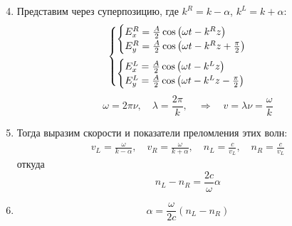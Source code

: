 \documentclass[10pt,pdf,hyperref={unicode}, dvipsnames]{beamer}
\begin{document}
\begin{frame}
	\begin{enumerate} 
		\setcounter{enumi}{3}
		\item
		      Представим через суперпозицию, где $k^R=k-\alpha$, $k^L=k+\alpha$:
		      \begin{gather*}
			      \begin{cases}
				      \begin{cases} 
					      E_x^R = \frac{A}{2}
					      \cos\left(
					      \omega t - k^Rz
					      \right)
					      \\
					      E_y^R = \frac{A}{2}
					      \cos\left(
					      \omega t - k^Rz +\frac{\pi}{2}
					      \right)
				      \end{cases}\vspace{0.5em} \\
				      \begin{cases} 
					      E_x^L = \frac{A}{2}
					      \cos\left(
					      \omega t - k^Lz
					      \right)
					      \\
					      E_y^L = \frac{A}{2}
					      \cos\left(
					      \omega t - k^Lz -\frac{\pi}{2}
					      \right)
				      \end{cases}
			      \end{cases}
		      \end{gather*}
		      \begin{equation*}
			      \omega=2\pi\nu,\quad
			      \lambda=\frac{2\pi}{k},\quad\Rightarrow\quad
			      v=\lambda\nu=\frac{\omega}{k}
		      \end{equation*}
		\item
		      Тогда выразим скорости и показатели преломления этих волн:
		      \begin{gather*}
			      v_L=\frac{\omega}{k-\alpha},
			      \quad
			      v_R=\frac{\omega}{k+\alpha},
			      \quad
			      n_L=\frac{c}{v_L},
			      \quad
			      n_R=\frac{c}{v_L}
		      \end{gather*}
		      откуда 
		      \begin{equation*}
			      n_L-n_R=\frac{2c}{\omega}\alpha
		      \end{equation*}
		\item
		      \begin{equation*}
			      \alpha=\frac{\omega}{2c}(n_L-n_R)
		      \end{equation*}
	\end{enumerate}
\end{frame}

\end{document}
